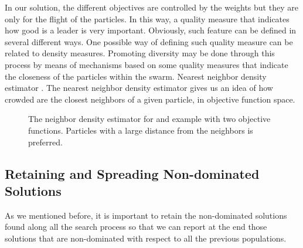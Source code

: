 \documentclass[11pt, runningheads,a4paper]{llncs}
\begin{document}
In our solution, the different objectives are controlled by the weights but they are only for the flight of the particles. In this way, a quality measure that indicates how good is a leader is very important. Obviously, such feature can be defined in several different ways. One possible way of defining such quality measure can be related to density measures. Promoting diversity may be done through this process by means of mechanisms based on some quality measures that indicate the closeness of the particles within the swarm.
Nearest neighbor density estimator \cite{nsga2002}. The nearest neighbor density estimator gives us an idea of how crowded are the closest neighbors of a given particle, in objective function space.
\begin{figure}
\centering
{}
\caption{The neighbor density estimator for and example with two objective functions. Particles with a large distance from the neighbors is preferred.}
\end{figure}

\subsection{Retaining and Spreading Non-dominated Solutions}
As we mentioned before, it is important to retain the non-dominated solutions found along all the search process so that we can report at the end those solutions that are non-dominated with respect to all the previous populations. 
\end{document}
